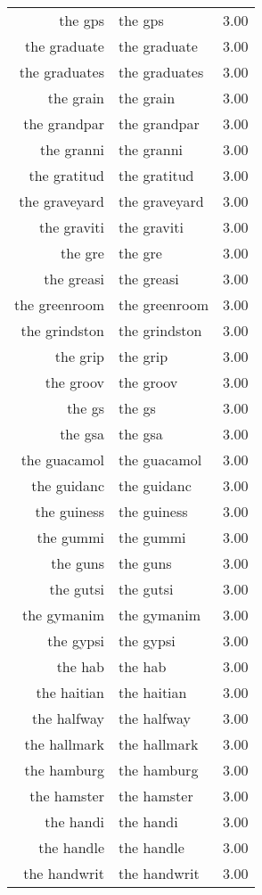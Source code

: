 \begin{table}[ht]
\begin{tabular}{rlr}
  the gps & the gps & 3.00 \\ 
  the graduate & the graduate & 3.00 \\ 
  the graduates & the graduates & 3.00 \\ 
  the grain & the grain & 3.00 \\ 
  the grandpar & the grandpar & 3.00 \\ 
  the granni & the granni & 3.00 \\ 
  the gratitud & the gratitud & 3.00 \\ 
  the graveyard & the graveyard & 3.00 \\ 
  the graviti & the graviti & 3.00 \\ 
  the gre & the gre & 3.00 \\ 
  the greasi & the greasi & 3.00 \\ 
  the greenroom & the greenroom & 3.00 \\ 
  the grindston & the grindston & 3.00 \\ 
  the grip & the grip & 3.00 \\ 
  the groov & the groov & 3.00 \\ 
  the gs & the gs & 3.00 \\ 
  the gsa & the gsa & 3.00 \\ 
  the guacamol & the guacamol & 3.00 \\ 
  the guidanc & the guidanc & 3.00 \\ 
  the guiness & the guiness & 3.00 \\ 
  the gummi & the gummi & 3.00 \\ 
  the guns & the guns & 3.00 \\ 
  the gutsi & the gutsi & 3.00 \\ 
  the gymanim & the gymanim & 3.00 \\ 
  the gypsi & the gypsi & 3.00 \\ 
  the hab & the hab & 3.00 \\ 
  the haitian & the haitian & 3.00 \\ 
  the halfway & the halfway & 3.00 \\ 
  the hallmark & the hallmark & 3.00 \\ 
  the hamburg & the hamburg & 3.00 \\ 
  the hamster & the hamster & 3.00 \\ 
  the handi & the handi & 3.00 \\ 
  the handle & the handle & 3.00 \\ 
  the handwrit & the handwrit & 3.00 \\ 

\end{tabular}
\end{table}
